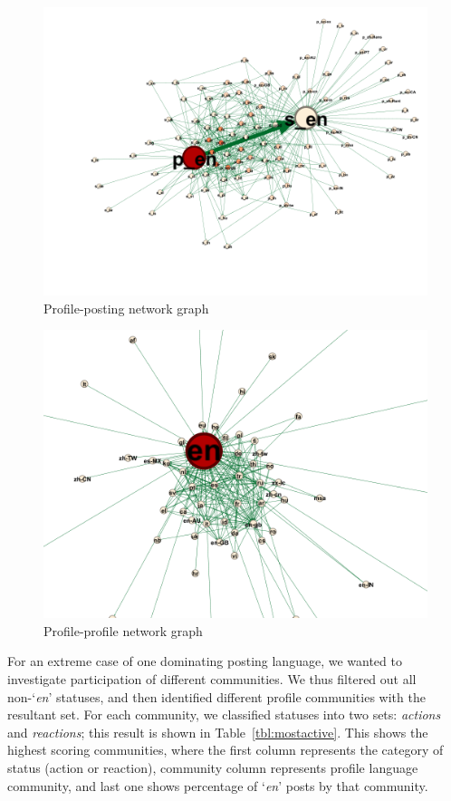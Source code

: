 \documentclass[conference]{IEEEtran}
\begin{document}
\begin{figure}[!h]
\centering
\includegraphics[width=\textwidth]{images/profilepostinggraph.png}
\caption{Profile-posting network graph}
\label{fig:profilepostinggraph}
\end{figure}

\begin{figure}[!h]
\centering
\includegraphics[width=\textwidth]{images/profileprofilegraph.png}
\caption{Profile-profile network graph}
\label{fig:profileprofilegraph}
\end{figure}

For an extreme case of one dominating posting language, we wanted to
investigate participation of different communities. We thus filtered
out all non-`{\emph{en}}' statuses, and then identified different
profile communities with the resultant set. For each community, we
classified statuses into two sets: {\emph{actions}} and
{\emph{reactions}}; this result is shown in
Table~\ref{tbl:mostactive}. This shows the highest scoring
communities, where the first column represents the category of status
(action or reaction), community column represents profile language
community, and last one shows percentage of `{\emph{en}}' posts by
that community.
\end{document}

